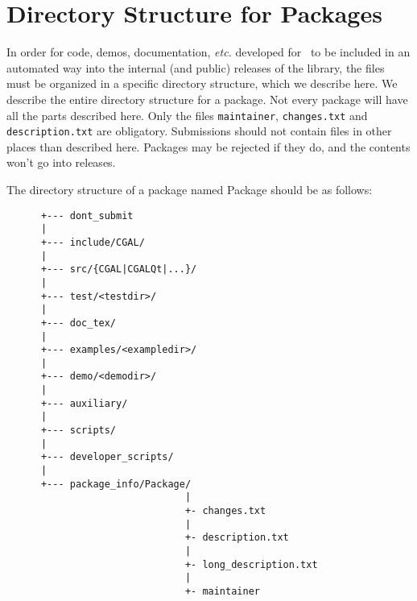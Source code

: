 
\chapter{Directory Structure for Packages\label{chap:directory_structure}}

In order for code, demos, documentation, {\em etc.} developed for \cgal\ to 
be included in an automated way into the internal (and public) releases of the 
library, the files must be organized in a specific directory structure, which 
we describe here.  We describe the entire directory structure for a package. 
Not every package will have all the parts described here. Only the files
{\tt maintainer}, {\tt changes.txt} and {\tt description.txt} 
are obligatory.
Submissions should not contain files in other places than described here.
Packages may be rejected if they do, and the contents won't go into releases.

The directory structure of a package named Package should be as follows: 

\begin{verbatim}
      +--- dont_submit
      |
      +--- include/CGAL/
      |
      +--- src/{CGAL|CGALQt|...}/
      |
      +--- test/<testdir>/
      |
      +--- doc_tex/
      |
      +--- examples/<exampledir>/
      |
      +--- demo/<demodir>/
      |
      +--- auxiliary/
      |
      +--- scripts/
      |
      +--- developer_scripts/
      |
      +--- package_info/Package/
                               |
                               +- changes.txt
                               |
                               +- description.txt
                               |
                               +- long_description.txt
                               |
                               +- maintainer
\end{verbatim}


